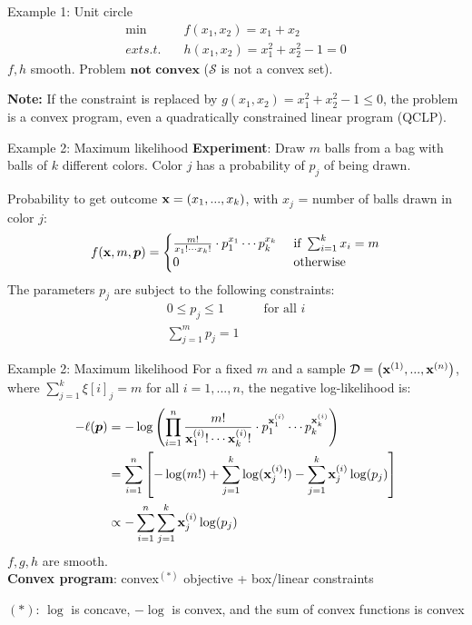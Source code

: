 \documentclass[11pt,compress,t,notes=noshow, xcolor=table]{beamer}
\begin{document}
\begin{frame2}{Example 1: Unit circle}
$$
\begin{aligned}
\min \quad & f(x_1, x_2) = x_1 + x_2 \\
ext{s.t. } \quad & h(x_1,x_2) = x_1^2 + x_2^2 - 1 = 0
\end{aligned}
$$
$f, h$ smooth. Problem $\textbf{not convex}$ ($\mathcal{S}$ is not a convex set).\\
\spacer
\begin{footnotesize}
\textbf{Note: } If the constraint is replaced by $g(x_1, x_2) = x_1^2 + x_2^2 - 1 \le 0$, the problem is a convex program, even a quadratically constrained linear program (QCLP).
\end{footnotesize}
\end{frame2}


\begin{frame2}{Example 2: Maximum likelihood}
\textbf{Experiment}: Draw $m$ balls from a bag with balls of $k$ different colors.
Color $j$ has a probability of $p_j$ of being drawn.

\vfill

Probability to get outcome $\xv = (x_1, ..., x_k)$, with $x_j$ = number of balls drawn in color $j$:
$$
f(\xv, m, \bm{p}) = \begin{cases} \frac{m!}{x_1! \cdots x_k!} \cdot p_1^{x_1} \cdots p_k^{x_k} & \text{ if } \sum_{i = 1}^k x_i = m \\ 0 & \text{ otherwise}\end{cases}
$$
The parameters $p_j$ are subject to the following constraints:
$$
\begin{aligned}
0 \le p_j \le 1 && \text{ for all } i \\
\sum_{j = 1}^m p_j = 1 &&
\end{aligned}
$$
\end{frame2}


\begin{frame2}{Example 2: Maximum likelihood}
For a fixed $m$ and a sample $\D = \left(\xi[1], ..., \xi[n]\right)$, where $\sum_{j = 1}^k \xi[i]_j = m$ for all $i = 1, ..., n$, the negative log-likelihood is:
$$
\begin{aligned}
- \ell(\bm{p}) &= - \log \left(\prod_{i = 1}^n  \frac{m!}{\xi_1! \cdots \xi_k!} \cdot p_1^{\xi_1} \cdots p_k^{\xi_k}    \right) \\
&= \sumin \left[- \log(m!) + \sum_{j = 1}^k \log(\xi_j!) - \sum_{j = 1}^k \xi_j \log(p_j)\right] \\
&\propto - \sumin \sum_{j = 1}^k \xi_j \log(p_j)
\end{aligned}
$$
$f, g, h$ are smooth.\\\textbf{Convex program}: convex$^{(*)}$ objective + box/linear constraints
\vfill
\begin{footnotesize}
${(*)}$: $\log$ is concave, $- \log $ is convex, and the sum of convex functions is convex
\end{footnotesize}
\end{frame2}
\end{document}
